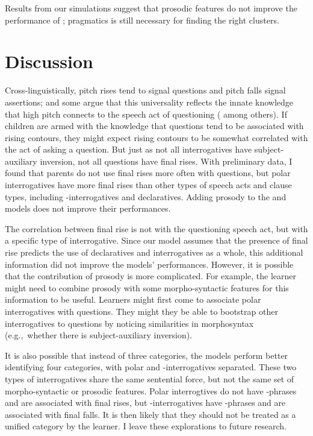 Results from our simulations suggest that prosodic features do not improve the performance of \dlearnerabbr{}; pragmatics is still necessary for finding the right clusters.


\section{Discussion}
\label{sec:prosody:discussion}
Cross-linguistically, pitch rises tend to signal questions and pitch falls signal assertions; and some argue that this universality reflects the innate knowledge that high pitch connects to the speech act of questioning (\cite{ohala1984,gussenhovenchen2000,gussenhoven2002} among others). If children are armed with the knowledge that questions tend to be associated with rising contours, they might expect rising contours to be somewhat correlated with the act of asking a question. But just as not all interrogatives have subject-auxiliary inversion, not all questions have final rises. With preliminary data, I found that parents do not use final rises more often with questions, but polar interrogatives have more final rises than other types of speech acts and clause types, including \twh-interrogatives and declaratives. Adding prosody to the \dlearnerabbr{} and \plearnerabbr{} models does not improve their performances. 


The correlation between final rise is not with the questioning speech act, but with a specific type of interrogative. Since our model assumes that the presence of final rise predicts the use of declaratives and interrogatives as a whole, this additional information did not improve the models' performances. However, it is possible that the contribution of prosody is more complicated. For example, the learner might need to combine prosody with some morpho-syntactic features for this information to be useful. Learners might first come to associate polar interrogatives with questions. They might they be able to bootstrap other interrogatives to questions by noticing similarities in morphosyntax (e.g.,~whether there is subject-auxiliary inversion). %

It is also possible that instead of three categories, the models perform better identifying four categories, with polar and \twh-interrogatives separated. These two types of interrogatives share the same sentential force, but not the same set of morpho-syntactic or prosodic features. Polar interrogtives do not have \twh-phrases and are associated with final rises, but \twh-interrogatives have \twh-phrases and are associated with final falls. It is then likely that they should not be treated as a unified category by the learner. I leave these explorations to future research. 

%